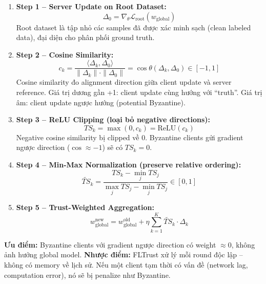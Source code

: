 \documentclass[12pt,a4paper]{article}
\begin{document}
\begin{enumerate}
    \item \textbf{Step 1 -- Server Update on Root Dataset:}
    \begin{equation}
        \Delta_0 = \nabla_\theta \mathcal{L}_{\text{root}}(w_{\text{global}})
    \end{equation}
    Root dataset là tập nhỏ các samples đã được xác minh sạch (clean labeled data), đại diện cho phân phối ground truth.

    \item \textbf{Step 2 -- Cosine Similarity:}
    \begin{equation}
        c_k = \frac{\langle \Delta_k, \Delta_0 \rangle}{\|\Delta_k\| \cdot \|\Delta_0\|}
             = \cos\theta(\Delta_k, \Delta_0) \in [-1, 1] \label{eq:cosine_sim}
    \end{equation}
    Cosine similarity đo alignment direction giữa client update và server reference. Giá trị dương gần +1: client update cùng hướng với ``truth''. Giá trị âm: client update ngược hướng (potential Byzantine).

    \item \textbf{Step 3 -- ReLU Clipping (loại bỏ negative directions):}
    \begin{equation}
        TS_k = \max(0, c_k) = \text{ReLU}(c_k) \label{eq:relu_clip}
    \end{equation}
    Negative cosine similarity bị clipped về 0. Byzantine clients gửi gradient ngược direction ($\cos \approx -1$) sẽ có $TS_k = 0$.

    \item \textbf{Step 4 -- Min-Max Normalization (preserve relative ordering):}
    \begin{equation}
        \tilde{TS}_k = \frac{TS_k - \min_j TS_j}{\max_j TS_j - \min_j TS_j} \in [0, 1] \label{eq:minmax_norm}
    \end{equation}

    \item \textbf{Step 5 -- Trust-Weighted Aggregation:}
    \begin{equation}
        w_{\text{global}}^{\text{new}} = w_{\text{global}}^{\text{old}} + \eta \sum_{k=1}^{K} \tilde{TS}_k \cdot \Delta_k \label{eq:fltrust_agg}
    \end{equation}
\end{enumerate}

\textbf{Ưu điểm:} Byzantine clients với gradient ngược direction có weight $\approx 0$, không ảnh hưởng global model. \textbf{Nhược điểm:} FLTrust xử lý mỗi round độc lập -- không có memory về lịch sử. Nếu một client tạm thời có vấn đề (network lag, computation error), nó sẽ bị penalize như Byzantine.
\end{document}

